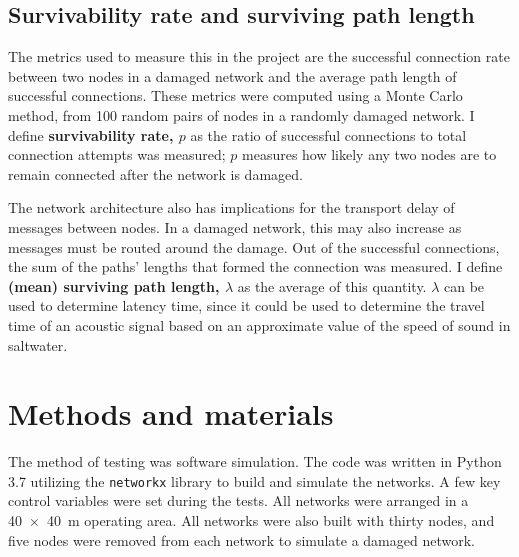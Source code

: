 \documentclass[twocolumn,10pt]{IEEEtran}
\begin{document}
\subsection{Survivability rate and surviving path length}
The metrics used to measure this in the project are the successful connection rate between two nodes in a damaged network and the average path length of successful connections. These metrics were computed using a Monte Carlo method, from 100 random pairs of nodes in a randomly damaged network. I define \textbf{survivability rate, $p$} as the ratio of successful connections to total connection attempts was measured; $p$ measures how likely any two nodes are to remain connected after the network is damaged. 

The network architecture also has implications for the transport delay of messages between nodes. In a damaged network, this may also increase as messages must be routed around the damage. Out of the successful connections, the sum of the paths' lengths that formed the connection was measured. I define \textbf{(mean) surviving path length, $\lambda$} as the average of this quantity. $\lambda$ can be used to determine latency time, since it could be used to determine the travel time of an acoustic signal based on an approximate value of the speed of sound in saltwater. 







\section{Methods and materials}
The method of testing was software simulation. The code was written in Python 3.7 utilizing the \lstinline{networkx} library \cite{hagberg2008exploring, sphyce2015networkx}to build and simulate the networks. A few key control variables were set during the tests. All networks were arranged in a \SI{40x40}{\meter} operating area. All networks were also built with thirty nodes, and five nodes were removed from each network to simulate a damaged network.
\end{document}
